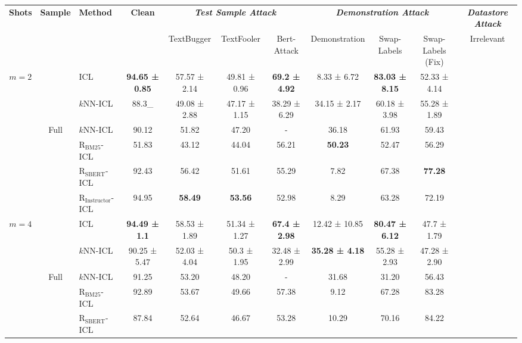 \begin{table*}[]
    \centering
    \tiny
    \begin{tabular}{ccl@{\hspace{-0.5\tabcolsep}}c|ccccccc}
    \toprule
    \multirow{2}{*}{\textbf{Shots}} & \multirow{2}{*}{\textbf{Sample}} & \multirow{2}{*}{\textbf{Method}} & \multirow{2}{*}{\textbf{Clean}} & \multicolumn{3}{c}{\textbf{\textit{Test Sample Attack}}} & \multicolumn{3}{c}{\textbf{\textit{Demonstration Attack}}} & \textbf{\textit{Datastore Attack}} \\
    Shots & Sample & Method & Clean & TextBugger & TextFooler & Bert-Attack & Demonstration & Swap-Labels & Swap-Labels (Fix)  & Irrelevant \\
     \multirow{6}{*}{{$m=2$}} & \rowcolor{lightgray} {} & ICL &\textbf{94.65 ± 0.85} & 57.57 ± 2.14 & 49.81 ± 0.96 & \textbf{69.2 ± 4.92} & 8.33 ± 6.72 & \textbf{83.03 ± 8.15}	& 52.33 ± 4.14 \\
         &  \rowcolor{lightgray} \multirow{-2}{*}{Random} & $k$NN-ICL & 88.3_{\pm 7.85} & 49.08 ± 2.88 & 47.17 ± 1.15 & 38.29 ± 6.29	& 34.15 ± 2.17 & 60.18 ± 3.98 & 55.28 ± 1.89 \\ 
         & \multirow{4}{*}{Full} & $k$NN-ICL & 90.12 & 51.82 & 47.20 & - & 36.18 & 61.93 & {59.43} \\
         & & $\text{R}_{\text{BM25}}$-ICL & 51.83 & 43.12 & 44.04 & 56.21 & \textbf{50.23} & 52.47 & 56.29 \\ 
         & & $\text{R}_{\text{SBERT}}$-ICL & 92.43 & 56.42 & 51.61 & 55.29 & 7.82 & 67.38 & \textbf{77.28} \\ 
         & & $\text{R}_{\text{Instructor}}$-ICL & 94.95 & \textbf{58.49} & \textbf{53.56} & 52.98 & 8.29 & 63.28 & 72.19 \\
        \multirow{6}{*}{{$m=4$}} & \rowcolor{lightgray} {} & ICL  & \textbf{94.49 ± 1.1} & 58.53 ± 1.89 & 51.34 ± 1.27 & \textbf{67.4 ± 2.98} & 12.42 ± 10.85 & \textbf{80.47 ± 6.12} & 47.7 ± 1.79 \\
         & \rowcolor{lightgray} \multirow{-2}{*}{Random} & $k$NN-ICL & 90.25 ± 5.47	& 52.03 ± 4.04 & 50.3 ± 1.95 & 32.48 ± 2.99 & \textbf{35.28 ± 4.18} & 55.28 ± 2.93 & 47.28 ± 2.90 \\ 
     & \multirow{4}{*}{Full} & $k$NN-ICL & 91.25 & 53.20 & 48.20 & - & {31.68} & 31.20 & {56.43} \\
         & & $\text{R}_{\text{BM25}}$-ICL & 92.89 & 53.67 & 49.66 & 57.38 & 9.12 & 67.28 & 83.28 \\ 
         & & $\text{R}_{\text{SBERT}}$-ICL & 87.84 & 52.64 & 46.67 & 53.28 & 10.29 & 70.16 & 84.22 \\ 

\end{tabular}
\end{table*}
